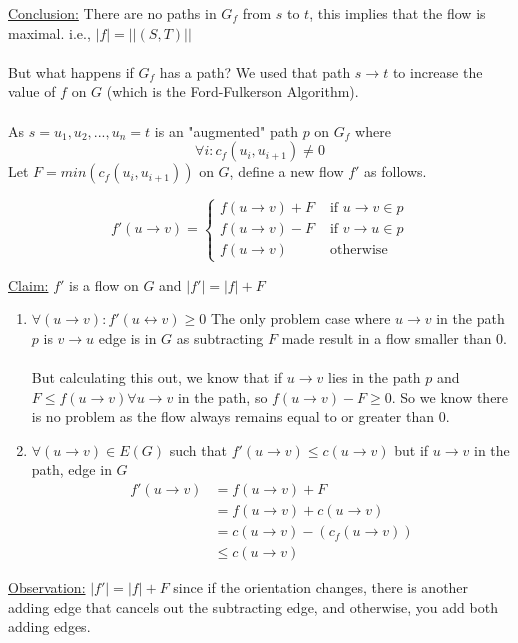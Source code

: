\documentclass[12pt]{article}
\begin{document}
\underline{Conclusion:} There are no paths in $G_f$ from $s$ to $t$, this implies that the flow is maximal. i.e., $|f|=||(S,T)||$\\
\\
But what happens if $G_f$ has a path? We used that path $s\rightarrow t$ to increase the value of $f$ on $G$ (which is the Ford-Fulkerson Algorithm).\\
\\
As $s=u_1, u_2, ... , u_n = t$ is an "augmented" path $p$ on $G_f$ where $$\forall i : c_f(u_i, u_{i+1}) \neq 0$$
Let $F = min(c_f (u_i, u_{i+1}))$ on $G$, define a new flow $f'$ as follows.

$$f'(u\rightarrow v) =\begin{cases}
	f(u\rightarrow v) + F &\text{ if } u\rightarrow v \in p\\
	f(u\rightarrow v) - F &\text{ if } v\rightarrow u \in p\\
	f(u\rightarrow v) &\text{ otherwise}
\end{cases}
$$

\underline{Claim:} $f'$ is a flow on $G$ and $|f'|=|f|+F$
\begin{enumerate}
	\item{
	$\forall (u\rightarrow v) : f'(u\leftrightarrow v) \geq 0$ The only problem case where $u\rightarrow v$ in the path $p$ is $v\rightarrow u$ edge is in $G$ as subtracting $F$ made result in a flow smaller than 0.\\
	\\
	But calculating this out, we know that if $u\rightarrow v$ lies in the path $p$ and $F \leq f(u\rightarrow v) \forall u \rightarrow v$ in the path, so $f(u\rightarrow v) - F \geq 0$. So we know there is no problem as the flow always remains equal to or greater than 0.
	}
	\item{
	$\forall (u\rightarrow v) \in E(G) $ such that $f'(u\rightarrow v) \leq c(u\rightarrow v)$ but if $u\rightarrow v$ in the path, edge in $G$ 
	\begin{align*}
	f'(u\rightarrow v) &= f(u\rightarrow v) + F\\ 
	&= f(u\rightarrow v) + c(u\rightarrow v)\\
	&= c(u\rightarrow v) - (c_f(u\rightarrow v))\\
	&\leq c(u\rightarrow v)
	\end{align*}
	}
\end{enumerate}

\underline{Observation:} $|f'|=|f|+F$ since if the orientation changes, there is another adding edge that cancels out the subtracting edge, and otherwise, you add both adding edges.
\end{document}
